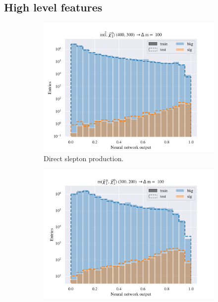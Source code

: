 \subsection{High level features}

\begin{figure}[H]
    \centering
    \begin{subfigure}[t!]{0.49\textwidth}
        \includegraphics[width = \textwidth]{Figures/SlepSlep/ML/NN/High_level/Low/scaled_train_test_395984.pdf}
        \caption{Direct slepton production.}
        \label{fig:}
    \end{subfigure}
    \begin{subfigure}[t!]{0.49\textwidth}
        \includegraphics[width = \textwidth]{Figures/SlepSnu/NN/High_level/Low/scaled_train_test_397115.pdf}

\end{subfigure}
\end{figure}
